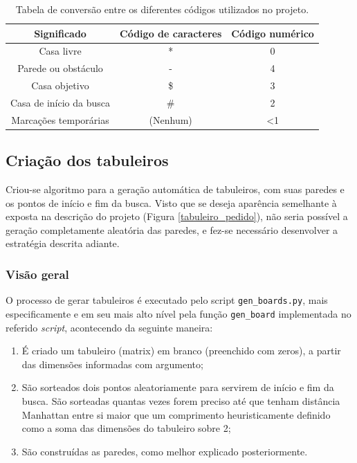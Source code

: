 \documentclass[12pt]{article}
\begin{document}
\begin{table}[h!]
	\label{codigo}
	\centering
	\begin{tabular}{c|c|c}
		Significado & Código de caracteres & Código numérico\\
		\hline
		Casa livre & * & 0\\
		Parede ou obstáculo & - & 4\\
		Casa objetivo & \$ & 3\\
		Casa de início da busca & \# & 2\\
		Marcações temporárias & (Nenhum) & \textless 1

	\end{tabular}
	\caption{Tabela de conversão entre os diferentes códigos utilizados no projeto.}
\end{table}

\subsection{Criação dos tabuleiros}
Criou-se algoritmo para a geração automática de tabuleiros, com suas paredes e os pontos de início e fim da busca. Visto que se deseja aparência semelhante à exposta na descrição do projeto (Figura \ref{tabuleiro_pedido}), não seria possível a geração completamente aleatória das paredes, e fez-se necessário desenvolver a estratégia descrita adiante.

\subsubsection{Visão geral}
 O processo de gerar tabuleiros é executado pelo script \texttt{gen\_boards.py}, mais especificamente e em seu mais alto nível pela função \verb|gen_board| implementada no referido \emph{script}, acontecendo da seguinte maneira:

\begin{enumerate}
	\item É criado um tabuleiro (matrix) em branco (preenchido com zeros), a partir das dimensões informadas com argumento;
	\item São sorteados dois pontos aleatoriamente para servirem de início e fim da busca. São sorteadas quantas vezes forem preciso até que tenham distância Manhattan entre si maior que um comprimento heuristicamente definido como a soma das dimensões do tabuleiro sobre 2;
	\item São construídas as paredes, como melhor explicado posteriormente.
\end{enumerate}
\end{document}
